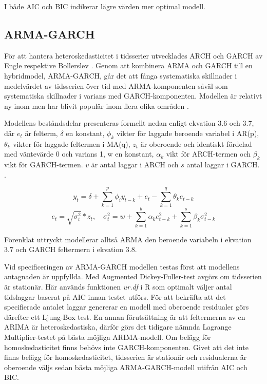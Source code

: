 \documentclass[11pt]{article}
\numberwithin{equation}{section}
\numberwithin{table}{section}
\numberwithin{figure}{section}
\begin{document}
I både AIC och BIC indikerar lägre värden mer optimal modell. 

\subsection{ARMA-GARCH}
För att hantera heteroskedasticitet i tidsserier utvecklades ARCH och GARCH av Engle \parencite*{engle1982autoregressive} respektive Bollerslev \parencite*{bollerslev1986generalized}. Genom att kombinera ARMA och GARCH till en hybridmodel, ARMA-GARCH, går det att fånga systematiska skillnader i medelvärdet av tidsserien över tid med ARMA-komponenten såväl som systematiska skillnader i varians med GARCH-komponenten. Modellen är relativt ny inom men har blivit populär inom flera olika områden \parencite{chen2011short}. 

Modellens beståndsdelar presenteras formellt nedan enligt ekvation 3.6 och 3.7, där \(e_t\) är felterm, \(\delta\) en konstant, \(\phi_k\) vikter för laggade beroende variabel i AR(p), \(\theta_k\) vikter för laggade feltermen i MA(q), \(z_t\) är oberoende och identiskt fördelad med väntevärde 0 och varians 1, w en konstant, \(\alpha_k\) vikt för ARCH-termen och \(\beta_k\) vikt för GARCH-termen. $v$ är antal laggar i ARCH och $s$ antal laggar i GARCH. \parencite[][,s.507 ff.]{bollerslev1986generalized, montgomery2015forecasting}.

\begin{equation}
    y_t = \delta + \sum_{k=1}^{p}\phi_iy_{t-k}  +e_t - \sum_{k=1}^{q}\theta_k e_{t-k} 
\end{equation}
\begin{equation}
    e_t=\sqrt{\sigma_t^2}*z_t,\quad \sigma^2_t=w + \sum_{k=1}^{b}\alpha_k e^2_{t-k} + \sum_{k=1}^{s}\beta_k \sigma^2_{t-k}
\end{equation}

Förenklat uttryckt modellerar alltså ARMA den beroende variabeln i ekvation 3.7 och GARCH feltermern i ekvation 3.8. 

Vid specificeringen av ARMA-GARCH modellen testas först att modellens antagnaden är uppfyllda. Med Augmented Dickey-Fuller-test avgörs om tidsserien är stationär. Här används funktionen \textit{ur.df} i R som optimalt väljer antal tidslaggar baserat på AIC innan testet utförs.  För att bekräfta att det specifierade antalet laggar genererar en modell med oberoende residualer görs därefter ett Ljung-Box test. En annan förutsättning är att feltermerna av en ARIMA är heteroskedastiska, därför görs det tidigare nämnda Lagrange Multiplier-testet på bästa möjliga ARIMA-modell. Om belägg för homoskedasticitet finns behövs inte GARCH-komponenten. Givet att det inte finns belägg för homoskedasticitet, tidsserien är stationär och residualerna är oberoende väljs sedan bästa möjliga ARMA-GARCH-modell utifrån AIC och BIC. 
\end{document}
